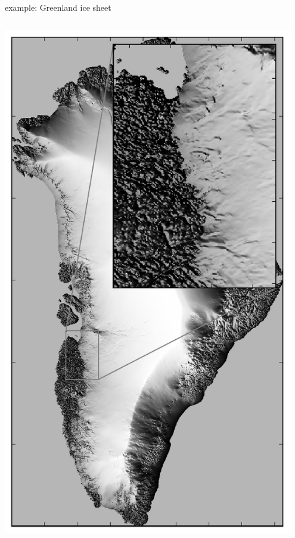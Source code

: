\documentclass[xcolor={dvipsnames}]{beamer}
\begin{document}
\begin{frame}{example: Greenland ice sheet}
\begin{columns}
\begin{column}{0.4\textwidth}
\begin{center}
\includegraphics[width=0.95\textwidth,keepaspectratio=true]{grnwinset}
\end{center}
\end{column}
\end{columns}
\end{frame}
\end{document}
